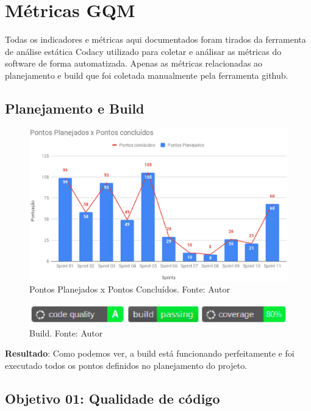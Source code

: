 \section{Métricas GQM}

Todas os indicadores e métricas aqui documentados foram tirados da ferramenta de análise estática Codacy utilizado para coletar e
análisar as métricas do software de forma automatizada. Apenas as métricas relacionadas ao planejamento e build que foi
coletada manualmente pela ferramenta github.

\subsection{Planejamento e Build}

\begin{figure}[h!]
	\centering
  \includegraphics[keepaspectratio=true,scale=0.5]{figuras/pontos_planejados.eps}
  \caption[Pontos Planejados x Pontos Concluídos.]{Pontos Planejados x Pontos Concluídos. Fonte: Autor}
	\label{fig:planejamento}
\end{figure}

\begin{figure}[h!]
	\centering
  \includegraphics[keepaspectratio=true,scale=0.8]{figuras/build.eps}
  \caption[Build.]{Build. Fonte: Autor}
	\label{fig:build}
\end{figure}

\textbf{Resultado}: Como podemos ver, a build está funcionando perfeitamente e foi executado todos os pontos definidos
no planejamento do projeto.

\subsection{Objetivo 01: Qualidade de código}

